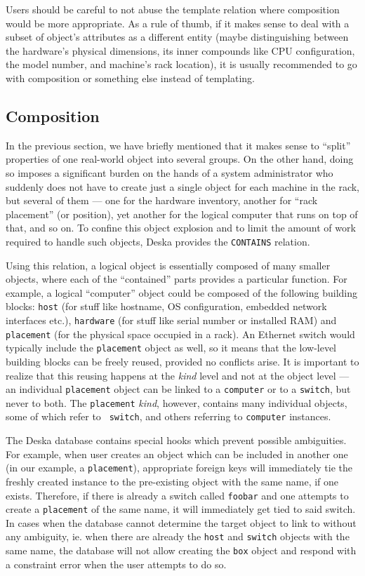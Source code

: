 \documentclass[deska]{subfiles}
\begin{document}
Users should be careful to not abuse the template relation where composition would be more appropriate.  As a rule of
thumb, if it makes sense to deal with a subset of object's attributes as a different entity (maybe distinguishing
between the hardware's physical dimensions, its inner compounds like CPU configuration, the model number, and machine's
rack location), it is usually recommended to go with composition or something else instead of templating.

\subsection{Composition}

In the previous section, we have briefly mentioned that it makes sense to ``split'' properties of one real-world object
into several groups.  On the other hand, doing so imposes a significant burden on the hands of a system administrator
who suddenly does not have to create just a single object for each machine in the rack, but several of them --- one for
the hardware inventory, another for ``rack placement'' (or position), yet another for the logical computer that runs on
top of that, and so on.  To confine this object explosion and to limit the amount of work required to handle such
objects, Deska provides the {\tt CONTAINS} relation.

Using this relation, a logical object is essentially composed of many smaller objects, where each of the ``contained''
parts provides a particular function.  For example, a logical ``computer'' object could be composed of the following
building blocks: {\tt host} (for stuff like hostname, OS configuration, embedded network interfaces etc.), {\tt hardware} (for stuff like
serial number or installed RAM) and {\tt placement} (for the physical space occupied in a rack).  An Ethernet switch would typically
include the {\tt placement} object as well, so it means that the low-level building blocks can be freely reused,
provided no conflicts arise.  It is important to realize that this reusing happens at the {\em kind} level and not at
the object level ---  an individual {\tt placement} object can be linked to a {\tt computer} or to a {\tt switch}, but
never to both.  The {\tt placement} {\em kind}, however, contains many individual objects, some of which refer to {\tt
switch}, and others referring to {\tt computer} instances.

The Deska database contains special hooks which prevent possible ambiguities. For example, when user creates an object
which can be included in another one (in our example, a {\tt placement}), appropriate foreign keys will immediately tie
the freshly created instance to the pre-existing object with the same name, if one exists.  Therefore, if there is
already a switch called {\tt foobar} and one attempts to create a {\tt placement} of the same name, it will immediately
get tied to said switch.  In cases when the database cannot determine the target object to link to without any
ambiguity, ie. when there are already the {\tt host} and {\tt switch} objects with the same name, the database will not
allow creating the {\tt box} object and respond with a constraint error when the user attempts to do so.
\end{document}

